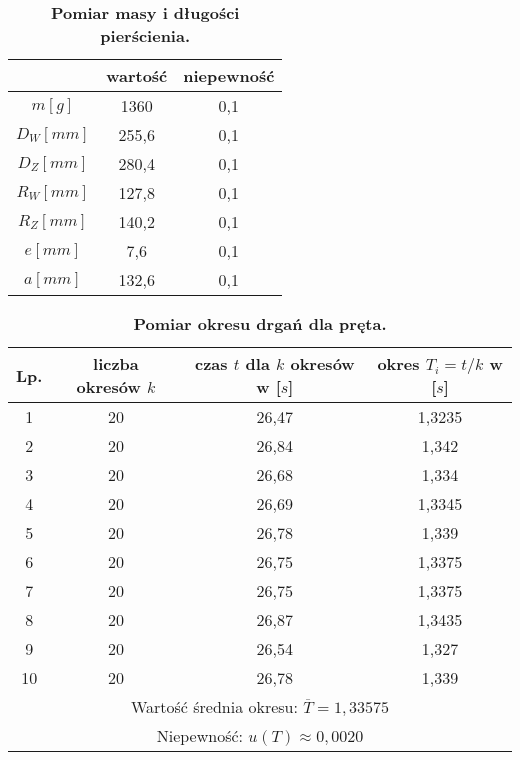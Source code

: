 \documentclass[a4paper,11pt]{article}
\begin{document}
\begin{table}[ht]
\centering
\setlength{\extrarowheight}{2pt}
\caption{\textbf{Pomiar masy i długości pierścienia.}}
\begin{tabular}{| @{\hspace{8mm}}c @{\hspace{8mm}}| @{\hspace{8mm}}c @{\hspace{8mm}}|@{\hspace{8mm}} c@{\hspace{8mm}}|}
\hline
 & wartość & niepewność  \\ \hline
$m[g]$ & 1360 & 0,1 \\ \hline
$D_{W}[mm]$ & 255,6 & 0,1 \\ \hline
$D_{Z}[mm]$ & 280,4 & 0,1 \\ \hline
$R_{W}[mm]$ & 127,8 & 0,1 \\ \hline
$R_{Z}[mm]$ & 140,2 & 0,1 \\ \hline
$e[mm]$ & 7,6 & 0,1 \\ \hline
$a[mm]$ & 132,6 & 0,1 \\ \hline

\end{tabular}
\end{table}

\begin{table}[ht]
\vspace*{0.5 cm}
\centering
\setlength{\extrarowheight}{2pt}
\caption{\textbf{Pomiar okresu drgań dla pręta.}}
\begin{tabular}{|c|c|c|c|}
\hline
Lp. & liczba okresów $k$ & czas $t$ dla $k$ okresów w [$s$] & okres $T_{i}=t/k$ w [$s$] \\ \hline
1 & 20 & 26,47 & 1,3235\\ \hline
2 & 20 & 26,84 & 1,342\\ \hline
3 & 20 & 26,68 & 1,334\\ \hline
4 & 20 & 26,69 & 1,3345\\ \hline
5 & 20 & 26,78 & 1,339\\ \hline
6 & 20 & 26,75 & 1,3375\\ \hline
7 & 20 & 26,75 & 1,3375\\ \hline
8 & 20 & 26,87 & 1,3435\\ \hline
9 & 20 & 26,54 & 1,327\\ \hline
10 & 20 & 26,78 & 1,339\\ \hline
\multicolumn{4}{|c|}{Wartość średnia okresu: $\overline{T}= 1,33575$} \\ \hline
\multicolumn{4}{|c|}{Niepewność: $u(T)\approx 0,0020$} \\ \hline
\end{tabular}
\end{table}
\end{document}
